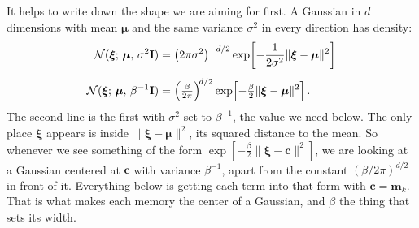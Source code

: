 It helps to write down the shape we are aiming for first. A Gaussian in $d$
dimensions with mean $\boldsymbol{\mu}$ and the same variance $\sigma^{2}$ in every
direction has density:
\begin{align}
  \mathcal{N}(\boldsymbol{\xi};\,\boldsymbol{\mu},\,\sigma^{2}\mathbf{I})
  &= \left(2\pi\sigma^{2}\right)^{-d/2}
     \exp\!\left[-\frac{1}{2\sigma^{2}}
       \lVert\boldsymbol{\xi}-\boldsymbol{\mu}\rVert^{2}\right]
     \notag\\[4pt]
  \mathcal{N}(\boldsymbol{\xi};\,\boldsymbol{\mu},\,\beta^{-1}\mathbf{I})
  &= \left(\tfrac{\beta}{2\pi}\right)^{\!d/2}
     \exp\!\left[-\tfrac\beta2
       \lVert\boldsymbol{\xi}-\boldsymbol{\mu}\rVert^{2}\right] .
  \label{eq:si-normal}
\end{align}
The second line is the first with $\sigma^{2}$ set to $\beta^{-1}$, the value we
need below. The only place $\boldsymbol{\xi}$ appears is inside
$\lVert\boldsymbol{\xi}-\boldsymbol{\mu}\rVert^{2}$, its squared distance to the
mean. So whenever we see something of the form
$\exp[-\tfrac\beta2\lVert\boldsymbol{\xi}-\mathbf{c}\rVert^{2}]$, we are looking at
a Gaussian centered at $\mathbf{c}$ with variance $\beta^{-1}$, apart from the
constant $(\beta/2\pi)^{d/2}$ in front of it. Everything below is getting each term
into that form with $\mathbf{c} = \mathbf{m}_k$. That is what makes each memory the
center of a Gaussian, and $\beta$ the thing that sets its width.

